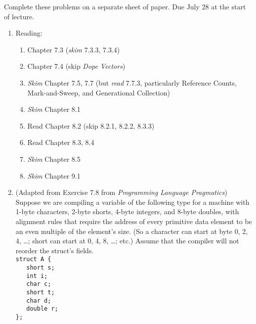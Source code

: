 \documentclass[9pt]{article}
\begin{document}
\noindent Complete these problems on a separate sheet of paper. Due July 28 at
the start of lecture.
\begin{enumerate}
   \item Reading:

         \begin{enumerate}
            \item Chapter 7.3 (\textit{skim} 7.3.3, 7.3.4)
            \item Chapter 7.4 (skip \textit{Dope Vectors})
            \item \textit{Skim} Chapter 7.5, 7.7 (but \textit{read} 7.7.3,
                  particularly Reference Counts, Mark-and-Sweep, and
                  Generational Collection)
            \item \textit{Skim} Chapter 8.1
            \item Read Chapter 8.2 (skip 8.2.1, 8.2.2, 8.3.3)
            \item Read Chapter 8.3, 8.4
            \item \textit{Skim} Chapter 8.5
            \item \textit{Skim} Chapter 9.1      
         \end{enumerate}
   \item (Adapted from Exercise 7.8 from
         \textit{Programming Language Pragmatics}) Suppose we are compiling a
         variable of the following type for a machine with 1-byte characters,
         2-byte shorts, 4-byte integers, and 8-byte doubles, with alignment
         rules that require the address of every primitive data element to be an
         even multiple of the element's size. (So a character can start at byte
         0, 2, 4, \ldots; short can start at 0, 4, 8, \ldots; etc.) Assume that
         the compiler will not reorder the struct's fields. \\

         \verb|struct A {| \\
         \verb|   short s;| \\
         \verb|   int i;| \\
         \verb|   char c;| \\
         \verb|   short t;| \\
         \verb|   char d;| \\
         \verb|   double r;| \\
         \verb|};| \\


\end{enumerate}
\end{document}
